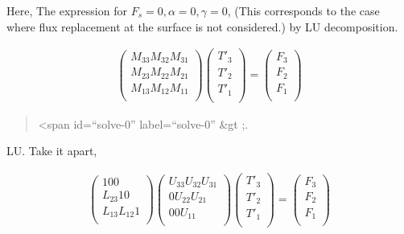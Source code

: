 Here, The expression for \(F_s = 0, \alpha=0, \gamma=0\), (This
corresponds to the case where flux replacement at the surface is not
considered.) by LU decomposition.

\begin{eqnarray}
  \left( \begin{array}{lll} M_{33}  M_{32}  M_{31} \\ M_{23}
  M_{22}  M_{21} \\ M_{13}  M_{12}  M_{11} \\
         \end{array} \right)
  \left( \begin{array}{l}
         T'_3 \\ T'_2 \\ T'_1 \\
         \end{array} \right)
  =
  \left(  \begin{array}{l}
          F_3 \\ F_2 \\ F_1 \\
          \end{array} \right)
\end{eqnarray}

\begin{quote}
\textless span id=``solve-0'' label=``solve-0'' \&gt ;.
\end{quote}

LU. Take it apart,

\begin{eqnarray}
  \left( \begin{array}{lll}
         1       0       0      \\
         L_{23}  1       0      \\
         L_{13}  L_{12}  1      \\
         \end{array} \right)
  \left( \begin{array}{lll}
         U_{33}  U_{32}  U_{31} \\
         0       U_{22}  U_{21} \\
         0       0       U_{11} \\
         \end{array} \right)
  \left( \begin{array}{l}
         T'_3 \\ T'_2 \\ T'_1 \\
         \end{array} \right)
  =
  \left(  \begin{array}{l}
          F_3 \\ F_2 \\ F_1 \\
          \end{array} \right)
\end{eqnarray}

